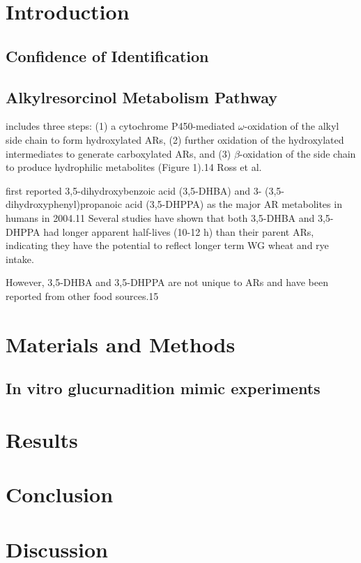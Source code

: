\section{Introduction}
\subsection{Confidence of Identification}

\subsection{Alkylresorcinol Metabolism Pathway}
includes three steps: 
(1) a cytochrome P450-mediated $\omega$-oxidation of the alkyl side chain to form hydroxylated ARs, 
(2) further oxidation of the hydroxylated intermediates to generate carboxylated ARs, and 
(3) $\beta$-oxidation of the side chain to produce hydrophilic metabolites (Figure 1).14 Ross et al. 

first reported 3,5-dihydroxybenzoic acid (3,5-DHBA) and 3- (3,5-dihydroxyphenyl)propanoic acid (3,5-DHPPA) as the major AR metabolites in humans in 2004.11 Several studies have shown that both 3,5-DHBA and 3,5-DHPPA had longer apparent half-lives (10-12 h) than their parent ARs, indicating they have the potential to reflect longer term WG wheat and rye intake.

However, 3,5-DHBA and 3,5-DHPPA are not unique to ARs and have been reported from other food sources.15

\section{Materials and Methods}
	\subsection{In vitro glucurnadition mimic experiments}
	
	

\section{Results}


\section{Conclusion}


\section{Discussion}